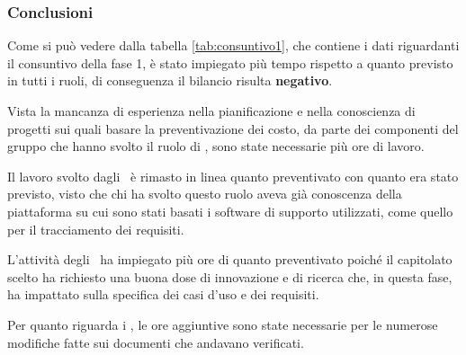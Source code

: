 \documentclass[../PianoDiProgetto.tex]{subfiles}
\begin{document}
		\subsubsection{Conclusioni}
		Come si può vedere dalla tabella \ref{tab:consuntivo1}, che contiene i dati riguardanti il consuntivo della fase 1, è stato impiegato più tempo rispetto a quanto previsto in tutti i ruoli, di conseguenza il bilancio risulta \textbf{negativo}.
		
			Vista la mancanza di esperienza nella pianificazione e nella conoscienza di progetti sui quali basare la preventivazione dei costo, da parte dei componenti del gruppo che hanno svolto il ruolo di \responsabilediprogetto, sono state necessarie più ore di lavoro.
			
			Il lavoro svolto dagli \amministratori\ è rimasto in linea quanto preventivato con quanto era stato previsto, visto che chi ha svolto questo ruolo aveva già conoscenza della piattaforma su cui sono stati basati i software di supporto utilizzati, come quello per il tracciamento dei requisiti.
			
			L'attività degli \analisti\ ha impiegato più ore di quanto preventivato poiché il capitolato scelto ha richiesto una buona dose di innovazione e di ricerca che, in questa fase, ha impattato sulla specifica dei casi d'uso e dei requisiti.
			
			Per quanto riguarda i \verificatori, le ore aggiuntive sono state necessarie per le numerose modifiche fatte sui documenti che andavano verificati. 
\end{document}
